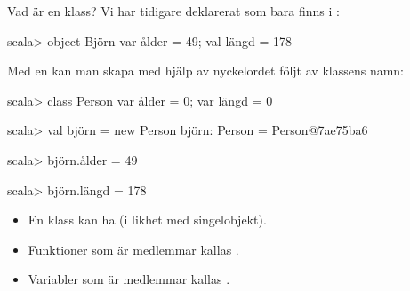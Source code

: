 

\begin{Slide}{Vad är en klass?}\SlideFontSmall
Vi har tidigare deklarerat  som bara finns i  :
\begin{REPLnonum}
scala> object Björn { var ålder = 49; val längd = 178 }
\end{REPLnonum}

Med en  kan man skapa   med hjälp av nyckelordet  följt av klassens namn:

\begin{REPLnonum}
scala> class Person { var ålder = 0; var längd = 0 }

scala> val björn = new Person
björn: Person = Person@7ae75ba6

scala> björn.ålder = 49

scala> björn.längd = 178
\end{REPLnonum}

\begin{itemize}

\item En klass kan ha  (i likhet med singelobjekt). 

\item Funktioner som är medlemmar kallas .

\item Variabler som är medlemmar kallas .


\end{itemize}

\end{Slide}


